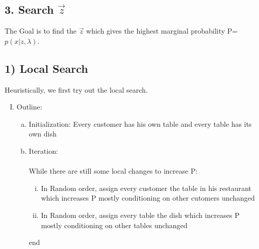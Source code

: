 \documentclass{article}
\begin{document}
\begin{spacing}{1.1}
\section{3. Search $\vec z$}
The Goal is to find the $\vec z$ which gives the highest marginal probability P=$p(x|z,\lambda)$.\\
\subsection{1) Local Search}
Heuristically, we first try out the local search.
\begin{enumerate}[(I)]
\item Outline:
\begin{enumerate}[(a)]
\item Initialization: Every customer has his own table and every table has its own dish
\item Iteration:\\
\\ While there are still some local changes to increase P:
\begin{enumerate}[(i)]
\item In Random order, assign every customer the table in his restaurant which increases P mostly conditioning on other cutomers unchanged
\item In Random order, assign every table the dish which increases P mostly conditioning on other tables unchanged
\end{enumerate}
end


\end{enumerate}
\end{enumerate}
\end{spacing}
\end{document}
